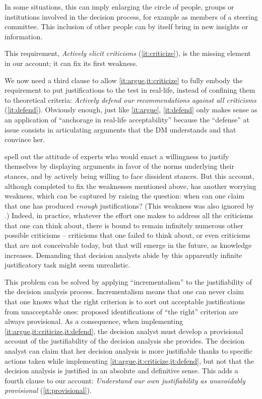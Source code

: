 \documentclass[preprint, french, english, 11pt, authoryear]{elsarticle}%
\begin{document}
In some situations, this can imply enlarging the circle of people, groups or institutions involved in the decision process, for example as members of a steering committee.
This inclusion of other people can by itself bring in new insights or information.
  
This requirement, \emph{Actively elicit criticisms} (\ref{it:criticize}), is the missing element in our account; it can fix its first weakness.

We now need a third clause to allow \cref{it:argue,it:criticize} to fully embody the requirement to put justifications to the test in real-life, instead of confining them to theoretical criteria: \emph{Actively defend our recommendations against all criticisms} (\ref{it:defend}).
Obviously enough, just like \cref{it:argue}, \cref{it:defend} only makes sense as an application of ``anchorage in real-life acceptability'' because the ``defense'' at issue consists in articulating arguments that the \ac{DM} understands and that convince her.

 spell out the attitude of experts who would enact a willingness to justify themselves by displaying arguments in favor of the norms underlying their stances, and by actively being willing to face dissident stances. 
But this account, although completed to fix the weaknesses mentioned above, has another worrying weakness, which can be captured by raising the question: when can one claim that one has produced \emph{enough} justifications? (This weakness was also ignored by  \citet{meinard_what_2017}.) 
Indeed, in practice, whatever the effort one makes to address all the criticisms that one can think about, there is bound to remain infinitely numerous other possible criticisms -- criticisms that one failed to think about, or even criticisms that are not conceivable today, but that will emerge in the future, as knowledge increases. 
Demanding that decision analysts abide by this apparently infinite justificatory task might seem unrealistic. 

This problem can be solved by applying ``incrementalism'' to the justifiability of the decision analysis process. 
Incrementalism means that one can never claim that one knows what the right criterion is to sort out acceptable justifications from unacceptable ones: proposed identifications of ``the right'' criterion are always provisional. 
As a consequence, when implementing \cref{it:argue,it:criticize,it:defend}, the decision analyst must develop a provisional account of the justifiability of the decision analysis she provides. 
The decision analyst can claim that her decision analysis is more justifiable thanks to specific actions taken while implementing \cref{it:argue,it:criticize,it:defend}, but not that the decision analysis is justified in an absolute and definitive sense. 
This adds a fourth clause to our account: \emph{Understand our own justifiability as unavoidably provisional} (\ref{it:provisional}).
\end{document}

